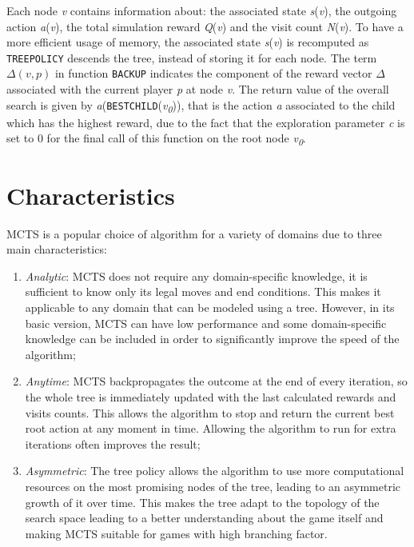 \medskip\noindent
Each node \textit{v} contains information about: the associated state \textit{s}(\textit{v}), the outgoing action \textit{a}(\textit{v}), the total simulation reward \textit{Q}(\textit{v}) and the visit count \textit{N}(\textit{v}). To have a more efficient usage of memory, the associated state \textit{s}(\textit{v}) is recomputed as \texttt{TREEPOLICY} descends the tree, instead of storing it for each node. The term $\Delta(v,p)$ in function \texttt{BACKUP} indicates the component of the reward vector $\Delta$ associated with the current player \textit{p} at node \textit{v}. The return value of the overall search is given by \textit{a}(\texttt{BESTCHILD}(\textit{v\textsubscript{0}})), that is the action \textit{a} associated to the child which has the highest reward, due to the fact that the exploration parameter \textit{c} is set to 0 for the final call of this function on the root node \textit{v\textsubscript{0}}.

\section{Characteristics}
MCTS is a popular choice of algorithm for a variety of domains due to three main characteristics:
\begin{enumerate}
    \item \textit{Analytic}: MCTS does not require any domain-specific knowledge, it is sufficient to know only its legal moves and end conditions. This makes it applicable to any domain that can be modeled using a tree. However, in its basic version, MCTS can have low performance and some domain-specific knowledge can be included in order to significantly improve the speed of the algorithm;
    \item \textit{Anytime}: MCTS backpropagates the outcome at the end of every iteration, so the whole tree is immediately updated with the last calculated rewards and visits counts. This allows the algorithm to stop and return the current best root action at any moment in time. Allowing the algorithm to run for extra iterations often improves the result;
    \item \textit{Asymmetric}: The tree policy allows the algorithm to use more computational resources on the most promising nodes of the tree, leading to an asymmetric growth of it over time. This makes the tree adapt to the topology of the search space leading to a better understanding about the game itself and making MCTS suitable for games with high branching factor.
\end{enumerate}

